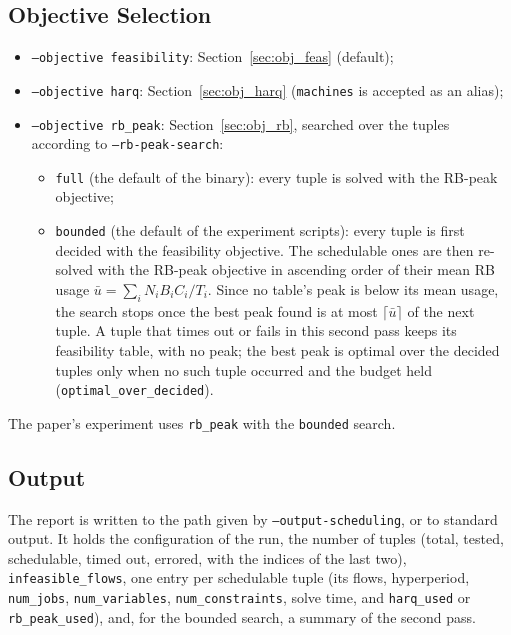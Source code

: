 \documentclass[11pt]{article}
\begin{document}
\subsection*{Objective Selection}

\begin{itemize}
    \item \texttt{--objective feasibility}: Section~\ref{sec:obj_feas}
          (default);
    \item \texttt{--objective harq}: Section~\ref{sec:obj_harq}
          (\texttt{machines} is accepted as an alias);
    \item \texttt{--objective rb\_peak}: Section~\ref{sec:obj_rb}, searched
          over the tuples according to \texttt{--rb-peak-search}:
    \begin{itemize}
        \item \texttt{full} (the default of the binary): every tuple is
              solved with the RB-peak objective;
        \item \texttt{bounded} (the default of the experiment scripts):
              every tuple is first decided with the feasibility objective.
              The schedulable ones are then re-solved with the RB-peak
              objective in ascending order of their mean RB usage
              $\bar{u} = \sum_i N_i B_i C_i / T_i$. Since no table's peak is
              below its mean usage, the search stops once the best peak found
              is at most $\lceil \bar{u} \rceil$ of the next tuple. A tuple
              that times out or fails in this second pass keeps its
              feasibility table, with no peak; the best peak is optimal over
              the decided tuples only when no such tuple occurred and the
              budget held (\texttt{optimal\_over\_decided}).
    \end{itemize}
\end{itemize}
The paper's experiment uses \texttt{rb\_peak} with the \texttt{bounded}
search.

\subsection*{Output}

The report is written to the path given by \texttt{--output-scheduling}, or
to standard output. It holds the configuration of the run, the number of
tuples (total, tested, schedulable, timed out, errored, with the indices of
the last two), \texttt{infeasible\_flows}, one entry per schedulable tuple
(its flows, hyperperiod, \texttt{num\_jobs}, \texttt{num\_variables},
\texttt{num\_constraints}, solve time, and \texttt{harq\_used} or
\texttt{rb\_peak\_used}), and, for the bounded search, a summary of the second
pass.
\end{document}
